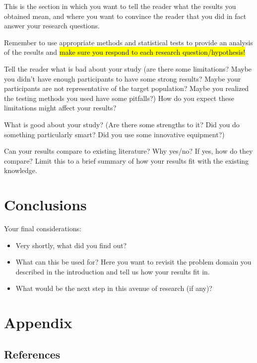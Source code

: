 \documentclass[conference]{IEEEtran}
\begin{document}
This is the section in which you want to tell the reader what the results you obtained mean, and where you want to convince the reader that you did in fact answer your research questions.

Remember to use appropriate methods and statistical tests to provide an analysis of the results and \hl{make sure you respond to each research question/hypothesis!}

Tell the reader what is bad about your study (are there some limitations? Maybe you didn’t have enough participants to have some strong results? Maybe your participants are not representative of the target population? Maybe you realized the testing methods you used have some pitfalls?) How do you expect these limitations might affect your results?

What is good about your study? (Are there some strengths to it? Did you do something particularly smart? Did you use some innovative equipment?)

Can your results compare to existing literature? Why yes/no? If yes, how do they compare? Limit this to a brief summary of how your results fit with the existing knowledge.


\section{Conclusions}

Your final considerations:

\begin{itemize}
	\item Very shortly, what did you find out?
	\item What can this be used for? Here you want to revisit the problem domain you described in the introduction and tell us how your results fit in.
	\item What would be the next step in this avenue of research (if any)?
\end{itemize}



\section*{Appendix}

\subsection{References}
\end{document}

